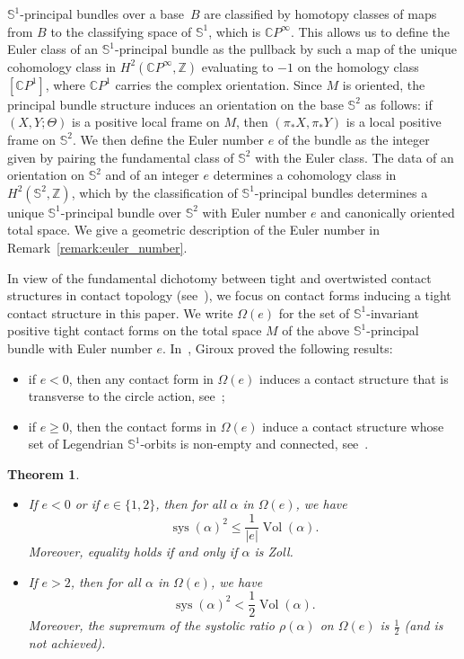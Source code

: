 \documentclass[10pt,a4paper]{amsart}
\DeclareMathOperator{\vol}{Vol}
\DeclareMathOperator{\sys}{sys}
\newcommand{\bbS}{\mathbb{S}}
\newcommand{\bbZ}{\mathbb{Z}}
\newcommand{\bbC}{\mathbb{C}}
\newtheorem{theo}{Theorem}[section]
\theoremstyle{definition}\newtheorem{defi}[theo]{Definition}
\begin{document}
$\bbS^1$-principal bundles over a base~$B$ are classified by homotopy classes of maps from $B$ to the classifying space of $\bbS^1$, which is $\bbC P^\infty$. This allows us to define the Euler class of an $\bbS^1$-principal bundle as the pullback by such a map of the unique cohomology class in $H^2(\bbC P^\infty, \bbZ)$ evaluating to $-1$ on the homology class $[\bbC P^1]$, where $\bbC P^1$ carries the complex orientation. Since $M$ is oriented, the principal bundle structure induces an orientation on the base $\bbS^2$ as follows: if $(X,Y; \Theta)$ is a positive local frame on $M$, then $(\pi_* X,\pi_* Y)$ is a local positive frame on $\bbS^2$. We then define the Euler number $e$ of the bundle as the integer given by pairing the fundamental class of $\bbS^2$ with the Euler class. The data of an orientation on $\bbS^2$ and of an integer $e$ determines a cohomology class in $H^2(\bbS^2, \bbZ)$, which by the classification of $\bbS^1$-principal bundles determines a unique $\bbS^1$-principal bundle over $\bbS^2$ with Euler number $e$ and canonically oriented total space. We give a geometric description of the Euler number in Remark~\ref{remark:euler_number}.

In view of the fundamental dichotomy between tight and overtwisted contact structures in contact topology (see~\cite{geiges_2008}), we focus on contact forms inducing a tight contact structure in this paper. We write $\Omega(e)$ for the set of $\bbS^1$-invariant positive tight contact forms on the total space $M$ of the above $\bbS^1$-principal bundle with Euler number $e$. In~\cite{Giroux1999StructuresDC}, Giroux proved the following results:
\begin{itemize}
\item if $e < 0$, then any contact form in $\Omega(e)$ induces a contact structure that is transverse to the circle action, see~\cite[Theorem~1.1]{Giroux1999StructuresDC};
\item if $e \geq 0$, then the contact forms in $\Omega(e)$ induce a contact structure whose set of Legendrian $\bbS^1$-orbits is non-empty and connected, see~\cite[Proposition~4.1.a]{Giroux1999StructuresDC}.
\end{itemize}

\begin{theo}\label{thm:ineg_sys_tight}
\leavevmode
\begin{itemize}
\item If $e < 0$ or if $e \in \{1,2\}$, then for all $\alpha$ in $\Omega(e)$, we have
\[
\sys(\alpha)^2 \leq \frac{1}{|e|} \vol(\alpha).
\]
Moreover, equality holds if and only if $\alpha$ is Zoll.
\item If $e > 2$, then for all $\alpha$ in $\Omega(e)$, we have
\[
\sys(\alpha)^2 < \frac{1}{2} \vol(\alpha).
\]
Moreover, the supremum of the systolic ratio $\rho(\alpha)$ on $\Omega(e)$ is $\frac{1}{2}$ (and is not achieved).
\end{itemize}
\end{theo}
\end{document}
